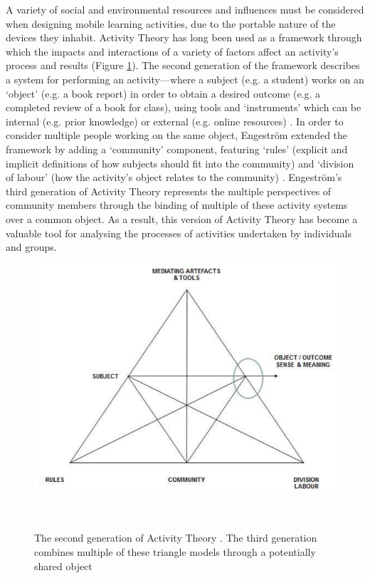 A variety of social and environmental resources and influences must be considered when designing mobile learning activities, due to the portable nature of the devices they inhabit. Activity Theory has long been used as a framework through which the impacts and interactions of a variety of factors affect an activity’s process and results (Figure \ref{fig:activityTheory}). The second generation of the framework describes a system for performing an activity---where a subject (e.g. a student) works on an `object' (e.g. a book report) in order to obtain a desired outcome (e.g. a completed review of a book for class), using tools and `instruments' which can be internal (e.g. prior knowledge) or external (e.g. online resources) \citep{leont1978}. In order to consider multiple people working on the same object, Engestr{\"o}m extended the framework by adding a `community' component, featuring `rules' (explicit and implicit definitions of how subjects should fit into the community) and `division of labour' (how the activity's object relates to the community) \citep{Engestrom2001}. Engestr{\"o}m's third generation of Activity Theory represents the multiple perspectives of community members through the binding of multiple of these activity systems over a common object. As a result, this version of Activity Theory has become a valuable tool for analysing the processes of activities undertaken by individuals and groups.

\begin{figure}
\centering
  \includegraphics[width=0.8\columnwidth]{images/chapter03/activityTheory.PNG}
  \caption[Second Generation Activity Theory]{The second generation of Activity Theory \citep{leont1978, Engestrom1987}. The third generation combines multiple of these triangle models through a potentially shared object \citep{Engestrom2001} }~\label{fig:activityTheory}
\end{figure}


